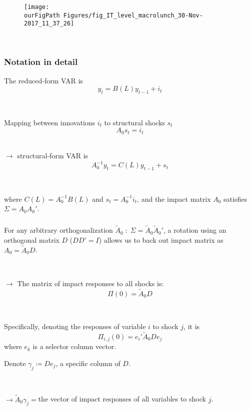 \documentclass{beamer}
\def \ourFigPath {../../}
\begin{document}
\begin{frame}
	\frametitle{}
	
		\noindent
	\begin{figure}
		\centering
		\texttt{[image: \\ourFigPath Figures/fig\_IT\_level\_macrolunch\_30-Nov-2017\_11\_37\_26]}
	\end{figure}
	

\

\hyperlink{motivation}{}	

\end{frame}

\begin{frame}
	\frametitle{Notation in detail}
	\label{VAR_notation}
The reduced-form VAR is
$$
y_t = B(L)y_{t-1} + i_t 
$$

\

Mapping between innovations $i_t$ to structural shocks $s_t$
$$
A_0 s_t = i_t
$$
\

$\rightarrow$ structural-form VAR is
$$
A_0^{-1}y_t = C(L) y_{t-1} + s_t
$$

\

where $C(L) = A_0^{-1} B(L)$ and $s_t = A_0^{-1} i_t$, and the impact matrix $A_0$ satisfies $\Sigma = A_0 A_0'$. 

\end{frame}

\begin{frame}
	\frametitle{}

For any arbitrary orthogonalization $\tilde{A}_0 \; : \; \Sigma = \tilde{A}_0 \tilde{A}_0'$, a rotation using an orthogonal matrix $D$ ($DD' = I$) allows us to back out impact matrix as $A_0 = \tilde{A}_0 D$. 

\

$\rightarrow$ The matrix of impact responses to all shocks is: 
$$
\Pi(0) = \tilde{A}_0 D
$$

\

Specifically, denoting the responses of variable $i$ to shock $j$, it is
$$
\Pi_{i,j}(0) = e_i' \tilde{A}_0 D e_j
$$
where $e_k$ is a selector column vector.

Denote $\gamma_j \coloneqq De_j$, a specific column of $D$. 

\

$\rightarrow \tilde{A}_0\gamma_j =$the vector of impact responses of all variables to shock $j$.

\

\hyperlink{baseline_spec}{}	
\end{frame}
\end{document}
